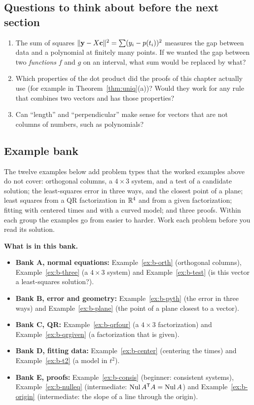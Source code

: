 \documentclass[11pt]{article}
\begin{document}
\subsection*{Questions to think about before the next section}
\begin{enumerate}[nosep]
  \item The sum of squares $\lVert\mathbf{y}-X\mathbf{c}\rVert^2=\sum(y_i-p(t_i))^2$ measures the gap between data and a polynomial at finitely many points. If we wanted the gap between two \emph{functions} $f$ and $g$ on an interval, what sum would be replaced by what?
  \item Which properties of the dot product did the proofs of this chapter actually use (for example in Theorem~\ref{thm:uniq}(a))? Would they work for any rule that combines two vectors and has those properties?
  \item Can ``length'' and ``perpendicular'' make sense for vectors that are not columns of numbers, such as polynomials?
\end{enumerate}

\subsection*{Example bank}
The twelve examples below add problem types that the worked examples above do not cover: orthogonal columns, a $4\times3$ system, and a test of a candidate solution; the least-squares error in three ways, and the closest point of a plane; least squares from a QR factorization in $\mathbb{R}^4$ and from a given factorization; fitting with centered times and with a curved model; and three proofs. Within each group the examples go from easier to harder. Work each problem before you read its solution.

\textbf{What is in this bank.}
\begin{itemize}
  \item \textbf{Bank A, normal equations:} Example~\ref{ex:b-orth} (orthogonal columns), Example~\ref{ex:b-three} (a $4\times3$ system) and Example~\ref{ex:b-test} (is this vector a least-squares solution?).
  \item \textbf{Bank B, error and geometry:} Example~\ref{ex:b-pyth} (the error in three ways) and Example~\ref{ex:b-plane} (the point of a plane closest to a vector).
  \item \textbf{Bank C, QR:} Example~\ref{ex:b-qrfour} (a $4\times3$ factorization) and Example~\ref{ex:b-qrgiven} (a factorization that is given).
  \item \textbf{Bank D, fitting data:} Example~\ref{ex:b-center} (centering the times) and Example~\ref{ex:b-t2} (a model in $t^2$).
  \item \textbf{Bank E, proofs:} Example~\ref{ex:b-consis} (beginner: consistent systems), Example~\ref{ex:b-nulleq} (intermediate: $\operatorname{Nul} A^{\mathsf T} A=\operatorname{Nul} A$) and Example~\ref{ex:b-origin} (intermediate: the slope of a line through the origin).
\end{itemize}
\end{document}
